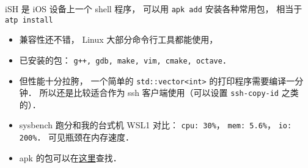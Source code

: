 
\begin{issues}
\issueDraft
\end{issues}

iSH 是 iOS 设备上一个 shell 程序， 可以用 \verb|apk add| 安装各种常用包， 相当于 \verb|atp install|

\begin{itemize}
\item 兼容性还不错， Linux 大部分命令行工具都能使用， \item 已安装的包： \verb|g++, gdb, make, vim, cmake, octave|．
\item 但性能十分拉胯， 一个简单的 \verb|std::vector<int>| 的打印程序需要编译一分钟． 所以还是比较适合作为 ssh 客户端使用（可以设置 \verb|ssh-copy-id| 之类的）．
\item sysbench 跑分和我的台式机 WSL1 对比： \verb|cpu: 30%|， \verb|mem: 5.6%|， \verb|io: 200%|． 可见瓶颈在内存速度．
\item apk 的包可以在\href{https://pkgs.alpinelinux.org/}{这里}查找．

\end{itemize}
